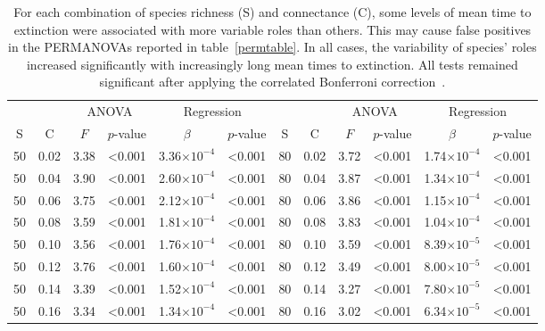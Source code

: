 \documentclass[12pt]{article}
\begin{document}
		\begin{table}[h!]
			\caption{For each combination of species richness (S) and connectance (C), some levels of mean time to extinction were associated with more variable roles than others. This may cause false positives in the PERMANOVAs reported in table~\ref{permtable}. In all cases, the variability of species' roles increased significantly with increasingly long mean times to extinction. All tests remained significant after applying the correlated Bonferroni correction~\citep{Drezner2016}.}
			\label{disptable}
			\footnotesize
			\begin{tabular}{c c | c c| c c ||c c | c c | c c |}
				&		&	\multicolumn{2}{c|}{ANOVA}	&\multicolumn{2}{c||}{Regression} 			& & & 	\multicolumn{2}{c|}{ANOVA}		 	&	 \multicolumn{2}{c|}{Regression} 			\\
	            S	&	C	&	$F$	&	$p$-value	&	$\beta$	&	$p$-value	&	S	&	C	&	$F$	&	$p$-value	&	$\beta$	&	$p$-value	\\
				\hline
	        50	&	0.02	&	3.38	&	\textless0.001	&	3.36$\times10^{-4}$	&	\textless0.001	&	80	&	0.02	&	3.72	&	\textless0.001	&	1.74$\times10^{-4}$	&	\textless0.001	\\
	        50	&	0.04	&	3.90	&	\textless0.001	&	2.60$\times10^{-4}$	&	\textless0.001	&	80	&	0.04	&	3.87	&	\textless0.001	&	1.34$\times10^{-4}$	&	\textless0.001	\\
	        50	&	0.06	&	3.75	&	\textless0.001	&	2.12$\times10^{-4}$	&	\textless0.001	&	80	&	0.06	&	3.86	&	\textless0.001	&	1.15$\times10^{-4}$	&	\textless0.001	\\
	        50	&	0.08	&	3.59	&	\textless0.001	&	1.81$\times10^{-4}$	&	\textless0.001	&	80	&	0.08	&	3.83	&	\textless0.001	&	1.04$\times10^{-4}$	&	\textless0.001	\\
	        50	&	0.10	&	3.56	&	\textless0.001	&	1.76$\times10^{-4}$	&	\textless0.001	&	80	&	0.10	&	3.59	&	\textless0.001	&	8.39$\times10^{-5}$	&	\textless0.001	\\
	        50	&	0.12	&	3.76	&	\textless0.001	&	1.60$\times10^{-4}$	&	\textless0.001	&	80	&	0.12	&	3.49	&	\textless0.001	&	8.00$\times10^{-5}$	&	\textless0.001	\\
	        50	&	0.14	&	3.39	&	\textless0.001	&	1.52$\times10^{-4}$	&	\textless0.001	&	80	&	0.14	&	3.27	&	\textless0.001	&	7.80$\times10^{-5}$	&	\textless0.001	\\
	        50	&	0.16	&	3.34	&	\textless0.001	&	1.34$\times10^{-4}$	&	\textless0.001	&	80	&	0.16	&	3.02	&	\textless0.001	&	6.34$\times10^{-5}$	&	\textless0.001	\\

\end{tabular}
\end{table}
\end{document}
